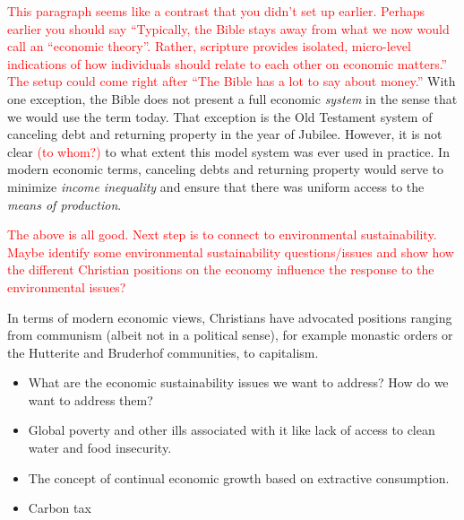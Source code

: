 \documentclass[12pt]{article}
\newcommand{\ins}[1]{\textcolor{red}{#1}}
\begin{document}
\ins{This paragraph seems like a contrast that you didn't set up earlier. 
Perhaps earlier you should say ``Typically, the Bible stays away from 
what we now would call an ``economic theory''. 
Rather, scripture provides isolated, micro-level indications of how individuals
should relate to each other on economic matters.''
The setup could come right after ``The Bible has a lot to say about money.''}
With one exception, the Bible does not present a full economic \emph{system} 
in the sense that we would use the term today.
That exception is the Old Testament system of canceling debt and returning property in the
year of Jubilee. However, it is not clear \ins{(to whom?)} 
to what extent this model system was ever used in practice.
In modern economic terms, canceling debts and returning property would serve to minimize 
\emph{income inequality} and ensure that there was uniform access to the \emph{means of production}.

\ins{The above is all good. 
Next step is to connect to environmental sustainability.
Maybe identify some environmental sustainability questions/issues
and show how the different Christian positions on the economy
influence the response to the environmental issues?}

In terms of modern economic views, Christians have advocated positions ranging from
communism (albeit not in a political sense), for example monastic orders or the Hutterite
and Bruderhof communities, to capitalism.

\begin{itemize}
\item{What are the economic sustainability issues we want to address? How do we want to address them?}
\item{Global poverty and other ills associated with it like lack of access to clean water and food insecurity.}
\item{The concept of continual economic growth based on extractive consumption.}
\item{Carbon tax}
\end{itemize}
%
%
%
\end{document}
